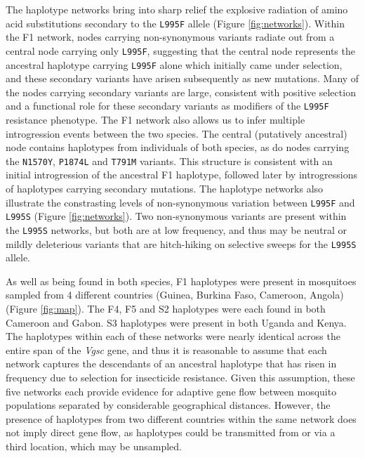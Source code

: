 \documentclass[a4paper,11pt,abstracton,hidelinks]{scrartcl}
\begin{document}
%
The haplotype networks bring into sharp relief the explosive radiation of amino acid substitutions secondary to the \texttt{L995F} allele (Figure \ref{fig:networks}).
%
Within the F1 network, nodes carrying non-synonymous variants radiate out from a central node carrying only \texttt{L995F}, suggesting that the central node represents the ancestral haplotype carrying \texttt{L995F} alone which initially came under selection, and these secondary variants have arisen subsequently as new mutations.
%
Many of the nodes carrying secondary variants are large, consistent with positive selection and a functional role for these secondary variants as modifiers of the \texttt{L995F} resistance phenotype.
%
The F1 network also allows us to infer multiple introgression events between the two species.
%
The central (putatively ancestral) node contains haplotypes from individuals of both species, as do nodes carrying the \texttt{N1570Y}, \texttt{P1874L} and \texttt{T791M} variants.
%
This structure is consistent with an initial introgression of the ancestral F1 haplotype, followed later by introgressions of haplotypes carrying secondary mutations.
%
The haplotype networks also illustrate the constrasting levels of non-synonymous variation between \texttt{L995F} and \texttt{L995S} (Figure \ref{fig:networks}).
%
Two non-synonymous variants are present within the \texttt{L995S} networks, but both are at low frequency, and thus may be neutral or mildly deleterious variants that are hitch-hiking on selective sweeps for the \texttt{L995S} allele.

%
As well as being found in both species, F1 haplotypes were present in mosquitoes sampled from 4 different countries (Guinea, Burkina Faso, Cameroon, Angola) (Figure \ref{fig:map}).
%
The F4, F5 and S2 haplotypes were each found in both Cameroon and Gabon.
%
S3 haplotypes were present in both Uganda and Kenya.
%
The haplotypes within each of these networks were nearly identical across the entire span of the \textit{Vgsc} gene, and thus it is reasonable to assume that each network captures the descendants of an ancestral haplotype that has risen in frequency due to selection for insecticide resistance.
%
Given this assumption, these five networks each provide evidence for adaptive gene flow between mosquito populations separated by considerable geographical distances.
%
However, the presence of haplotypes from two different countries within the same network does not imply direct gene flow, as haplotypes could be transmitted from or via a third location, which may be unsampled.
%
\end{document}
